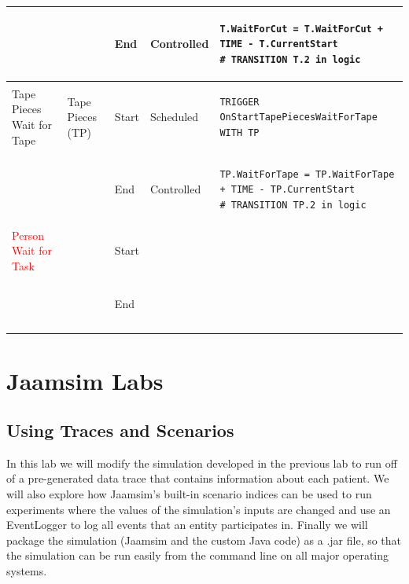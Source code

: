 \documentclass[
  10pt,
  a4paperpaper,
  DIV=11,
  numbers=noendperiod,
  oneside]{scrreprt}
\begin{document}
\begin{longtable}{@{}>{\raggedright\arraybackslash}p{1.8cm}>{\raggedright\arraybackslash}p{2.1cm}>{\raggedright\arraybackslash}p{0.9cm}>{\raggedright\arraybackslash}p{2.2cm}>{\raggedright\arraybackslash}p{8.75cm}@{}}
  &                                                          & End   & Controlled & 
\begin{lstlisting}[language=CMPseudo]
T.WaitForCut = T.WaitForCut + TIME - T.CurrentStart
# TRANSITION T.2 in logic
\end{lstlisting}             \\ \midrule
  Tape Pieces Wait for Tape & Tape Pieces (TP)                       & Start & Scheduled  & 
\begin{lstlisting}[language=CMPseudo]
TRIGGER OnStartTapePiecesWaitForTape WITH TP
\end{lstlisting}             \\
  &                                                          & End   & Controlled & 
\begin{lstlisting}[language=CMPseudo]
TP.WaitForTape = TP.WaitForTape + TIME - TP.CurrentStart
# TRANSITION TP.2 in logic
\end{lstlisting}             \\ \midrule
  \textcolor{red}{Person Wait for Task}      &                              & Start &   & 
\begin{lstlisting}[language=CMPseudo]
 
\end{lstlisting}             \\
  &                                                          & End   &  & 
\begin{lstlisting}[language=CMPseudo]
 
 
\end{lstlisting}             \\ \bottomrule
  

\end{longtable}

\part{Jaamsim Labs}

\chapter{Using Traces and Scenarios}\label{using-traces-and-scenarios}

In this lab we will modify the simulation developed in the previous lab
to run off of a pre-generated data trace that contains information about
each patient. We will also explore how Jaamsim's built-in scenario
indices can be used to run experiments where the values of the
simulation's inputs are changed and use an EventLogger to log all events
that an entity participates in. Finally we will package the simulation
(Jaamsim and the custom Java code) as a .jar file, so that the
simulation can be run easily from the command line on all major
operating systems.
\end{document}
